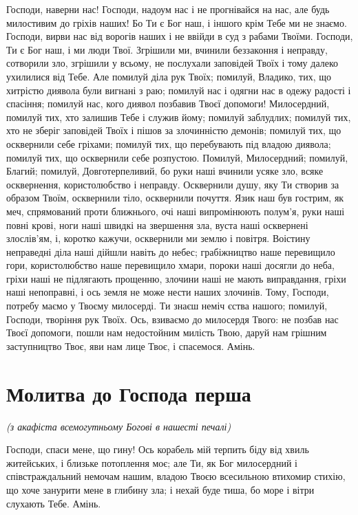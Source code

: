 \documentclass[chapters.tex]{subfiles}
\begin{document}
Господи, наверни нас! Господи, надоум нас і не прогнівайся на нас, але будь милостивим до гріхів наших! Бо Ти є Бог наш, і іншого крім Тебе ми не знаємо. Господи, вирви нас від ворогів наших і не ввійди в суд з рабами Твоїми. Господи, Ти є Бог наш, і ми люди Твої. Згрішили ми, вчинили беззаконня і неправду, сотворили зло, згрішили у всьому, не послухали заповідей Твоїх і тому далеко ухилилися від Тебе. Але помилуй діла рук Твоїх; помилуй, Владико, тих, що хитрістю диявола були вигнані з раю; помилуй нас і одягни нас в одежу радості і спасіння; помилуй нас, кого диявол позбавив Твоєї допомоги! Милосердний, помилуй тих, хто залишив Тебе і служив йому; помилуй заблудлих; помилуй тих, хто не зберіг заповідей Твоїх і пішов за злочинністю демонів; помилуй тих, що осквернили себе гріхами; помилуй тих, що перебувають під владою диявола; помилуй тих, що осквернили себе розпустою. Помилуй, Милосердний; помилуй, Благий; помилуй, Довготерпеливий, бо руки наші вчинили усяке зло, всяке осквернення, користолюбство і неправду. Осквернили душу, яку Ти створив за образом Твоїм, осквернили тіло, осквернили почуття. Язик наш був гострим, як меч, спрямований проти ближнього, очі наші випромінюють полум’я, руки наші повні крові, ноги наші швидкі на звершення зла, вуста наші осквернені злослів’ям, і, коротко кажучи, осквернили ми землю і повітря. Воістину неправедні діла наші дійшли навіть до небес; грабіжництво наше перевищило гори, користолюбство наше перевищило хмари, пороки наші досягли до неба, гріхи наші не підлягають прощенню, злочини наші не мають виправдання, гріхи наші непоправні, і ось земля не може нести наших злочинів. Тому, Господи, потребу маємо у Твоєму милосерді. Ти знаєш неміч єства нашого; помилуй, Господи, творіння рук Твоїх. Ось, взиваємо до милосердя Твого: не позбав нас Твоєї допомоги, пошли нам недостойним милість Твою, даруй нам грішним заступництво Твоє, яви нам лице Твоє, і спасемося. Амінь.

\section{Молитва до Господа перша}
\emph{(з акафіста всемогутньому Богові в нашесті печалі)}

Господи, спаси мене, що гину! Ось корабель мій терпить біду від хвиль житейських, і близьке потоплення моє; але Ти, як Бог милосердний і співстраждальний немочам нашим, владою Твоєю всесильною втихомир стихію, що хоче занурити мене в глибину зла; і нехай буде тиша, бо море і вітри слухають Тебе. Амінь.
\end{document}
